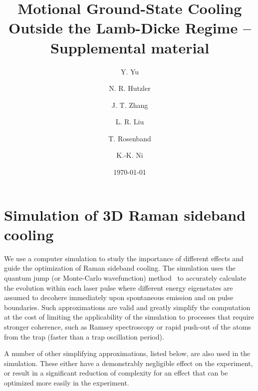 \documentclass[aps,secnumarabic,amsmath,amssymb]{revtex4}
\begin{document}
\title{Motional Ground-State Cooling Outside the Lamb-Dicke Regime -- Supplemental material}
\author{Y. Yu}
\author{N. R. Hutzler}
\author{J. T. Zhang}
\author{L. R. Liu}
\author{T. Rosenband}
\author{K.-K. Ni}

\date{\today}

\maketitle

\section{Simulation of 3D Raman sideband cooling}

We use a computer simulation to study the importance of different effects
and guide the optimization of Raman sideband cooling.
The simulation uses the quantum jump (or Monte-Carlo wavefunction) method~\cite{Dalibard1992,Chretien2014}
to accurately calculate the evolution within each laser pulse where different energy eigenstates
are assumed to decohere immediately upon spontaneous emission and on pulse boundaries.
Such approximations are valid and greatly simplify the computation
at the cost of limiting the applicability of the simulation to processes that require stronger
coherence, such as Ramsey spectroscopy or rapid push-out of the atoms from the trap
(faster than a trap oscillation period).

A number of other simplifying approximations, listed below, are also used in the simulation.
These either have a demonstrably negligible effect on the experiment,
or result in a significant reduction of complexity for an effect
that can be optimized more easily in the experiment.
\end{document}
